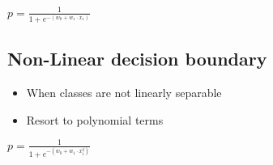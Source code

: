 \begin{center}
    $p = \frac{1}{1 + e^{-(w_0 + w_1 \cdot x_1)}}$
\end{center}

\subsection{Non-Linear decision boundary}
\begin{itemize}
    \item When classes are not linearly separable
    \item Resort to polynomial terms
\end{itemize}

\begin{center}
    $p = \frac{1}{1 + e^{-(w_0 + w_1 \cdot x^{2}_1)}}$
\end{center}
